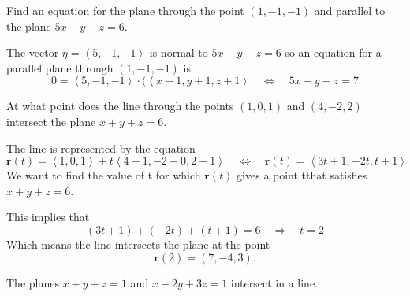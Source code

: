 \documentclass[12pt]{exam}
\newcommand{\br}{\bm{r}}
\newcommand{\gen}[1]{\left\langle #1 \right\rangle}
\theoremstyle{definition}
\theoremstyle{remark}
\begin{document}
\begin{questions}
\question Find an equation for the plane through the point \((1,-1,-1)\) and parallel to the plane \(5x-y-z=6\).

\ifprintanswers
        \begin{solution}

            The vector \(\eta=\gen{5,-1,-1}\) is normal to \(5x-y-z=6\) so an equation for a parallel plane through \((1,-1,-1)\) is 
            \[
                0 = \gen{5,-1,-1}\cdot(\gen{x-1,y+1,z+1} \quad \iff \quad 5x-y-z=7
            \]

        \end{solution}
    \else
        \vfill
    \fi

\question At what point does the line through the points \((1,0,1)\) and \((4,-2,2)\) intersect the plane \(x+y+z=6\).

\ifprintanswers
        \begin{solution}
            The line is represented by the equation
            \[
                \br(t)=\gen{1,0,1}+t\gen{4-1,-2-0,2-1} \quad\iff\quad \br(t) = \gen{3t+1,-2t,t+1}
            \]
            We want to find the value of t for which \(\br(t)\) gives a point tthat satisfies \(x+y+z=6\).

            This implies that 
            \[
                (3t+1)+(-2t)+(t+1) = 6\quad \Rightarrow\quad t=2 
            \]
            Which means the line intersects the plane at the point
            \[
                \br(2)=(7,-4,3).
            \]
        \end{solution}
    \else
        \vfill
    \fi

\newpage 

\question The planes \(x+y+z=1\) and \(x-2y+3z=1\) intersect in a line.
\end{questions}
\end{document}
